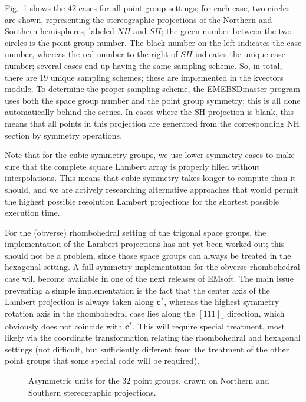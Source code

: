 \documentclass[DIV=calc, paper=letter, fontsize=11pt]{scrartcl}	 %
\begin{document}
Fig.~\ref{fig:hemispheres} shows the $42$ cases for all point group settings; for each case, two circles are shown, representing the 
stereographic projections of the Northern and Southern hemispheres, labeled $NH$ and $SH$; the green number between the two
circles is the point group number.  The black number on the left indicates the case number, whereas the red number to the right of $SH$
indicates the unique case number; several cases end up having the same sampling scheme.  So, in total, there are 19 unique
sampling schemes; these are implemented in the \textsf{kvectors} module.  To determine the proper sampling scheme, the 
\textsf{EMEBSDmaster} program uses both the space group number and the point group symmetry; this is all done automatically
behind the scenes.  In cases where the SH projection is blank, this means that all points in this projection are generated from the 
corresponding NH section by symmetry operations.

Note that for the cubic symmetry groups, we use lower symmetry cases to make sure that the complete square Lambert array
is properly filled without interpolations.  This means that cubic symmetry takes longer to compute than it should, and we are 
actively researching alternative approaches that would permit the highest possible resolution Lambert projections for the 
shortest possible execution time.

For the (obverse) rhombohedral setting of the trigonal space groups, the implementation of the Lambert projections has 
not yet been worked out; this should not be a problem, since those space groups can always be treated in the hexagonal
setting.  A full symmetry implementation for the obverse rhombohedral case will become available in one of the next releases
of \textsf{EMsoft}.  The main issue preventing a simple implementation is the fact that the center axis of the Lambert projection
is always taken along $\mathbf{c}^{\ast}$, whereas the highest symmetry rotation axis in the rhombohedral case lies along the 
$[111]_r$ direction, which obviously does not coincide with $\mathbf{c}^{\ast}$.  This will require special treatment, most likely 
via the coordinate transformation relating the rhombohedral and hexagonal settings (not difficult, but sufficiently different 
from the treatment of the other point groups that some special code will be required).

\begin{figure}[t]
\centering\leavevmode
\epsfxsize=6.5in
\caption{\label{fig:hemispheres}Asymmetric units for the $32$ point groups, drawn on Northern and Southern stereographic projections.}
\end{figure}
\end{document}
